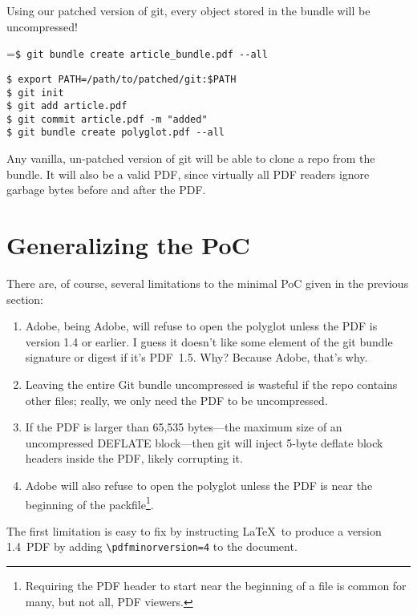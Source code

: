\documentclass{article}
\begin{document}
Using our patched version of git, every object stored in the bundle
will be uncompressed!
\begin{center}
\begingroup
{}=\hbox{\footnotesize\verb|$ git bundle create article_bundle.pdf --all|}
\begin{minipage}{\wd9}
\footnotesize\begin{verbatim}
$ export PATH=/path/to/patched/git:$PATH
$ git init
$ git add article.pdf
$ git commit article.pdf -m "added"
$ git bundle create polyglot.pdf --all
\end{verbatim}
\end{minipage}
\endgroup
\end{center}
Any vanilla, un-patched version of git will be able to clone a repo
from the bundle. It will also be a valid PDF, since virtually all
PDF readers ignore garbage bytes before and after the PDF.

\section{Generalizing the PoC}

There are, of course, several limitations to the minimal PoC given in
the previous section:
\begin{enumerate}

\item Adobe, being Adobe, will refuse to open the polyglot unless the PDF is version 1.4 or earlier.  I guess it doesn't like some element of the git bundle signature or digest if it's PDF~1.5. Why? Because Adobe, that's why.

\item Leaving the entire Git bundle uncompressed is wasteful if the repo contains other files; really, we only need the PDF to be uncompressed.

\item If the PDF is larger than 65,535 bytes---the maximum size of an uncompressed DEFLATE block---then git will inject 5-byte deflate block headers inside the PDF, likely corrupting it.

\item Adobe will also refuse to open the polyglot unless the PDF is near the beginning of the packfile\footnote{Requiring the PDF header to start near the beginning of a file is common for many, but not all, PDF viewers.}.

\end{enumerate}

The first limitation is easy to fix by instructing \LaTeX\ to produce
a version 1.4~PDF by adding \texttt{\textbackslash pdfminorversion=4}
to the document.
\end{document}
